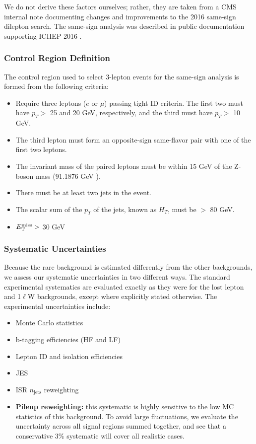 We do not derive these factors ourselves; rather, they are taken
from a CMS internal note documenting changes and improvements to the
2016 same-sign dilepton search. The same-sign analysis was described
in public documentation supporting ICHEP 2016 \cite{samesign}.

\subsubsection{Control Region Definition}
\label{sssec:stop:rarebkg:crdefinitions}

The control region used to select 3-lepton events for the same-sign
analysis is formed from the following criteria:
\begin{itemize}
\item Require three leptons ($e$ or $\mu$) passing tight ID
  criteria. The first two must have $p_T >$ 25 and 20 GeV,
  respectively, and the third must have $p_T >$ 10 GeV.
\item The third lepton must form an opposite-sign same-flavor pair
  with one of the first two leptons.
\item The invariant mass of the paired leptons must be within 15 GeV
  of the Z-boson mass (91.1876 GeV \cite{pdg}).
\item There must be at least two jets in the event.
\item The scalar sum of the $p_T$ of the jets, known as $H_T$, must
  be $>$ 80 GeV.
\item $E_\text{T}^\text{miss} >$ 30 GeV
\end{itemize}

\subsubsection{Systematic Uncertainties}
\label{sssec:stop:rarebkg:systematics}

Because the rare background is estimated differently from the other
backgrounds, we assess our systematic uncertainties in two different
ways. The standard experimental systematics are evaluated exactly as
they were for the lost lepton and 1$\ell$W backgrounds, except where
explicitly stated otherwise. The experimental uncertainties include:
\begin{itemize}
\item Monte Carlo statistics
\item b-tagging efficiencies (HF and LF)
\item Lepton ID and isolation efficiencies
\item JES
\item ISR $n_\text{jets}$ reweighting
\item \textbf{Pileup reweighting:} this systematic is highly sensitive to the
  low MC statistics of this background. To avoid large fluctuations,
  we evaluate the uncertainty across all signal regions summed
  together, and see that a conservative 3\% systematic will cover all
  realistic cases.
\end{itemize}

